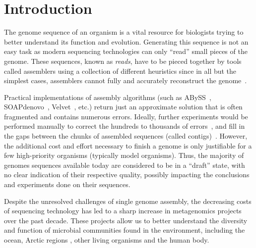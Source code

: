 \documentclass[conference]{IEEEtran}
\begin{document}




%
\IEEEpeerreviewmaketitle



\section{Introduction}
The genome sequence of an organism is a vital resource for biologists trying to better understand its function and evolution.
Generating this sequence is not an easy task as modern sequencing technologies can only ``read'' small pieces of the genome.
These sequences, known as \emph{reads}, have to be pieced together by tools called assemblers using a collection of different heuristics since in all but the simplest cases, assemblers cannot fully and accurately reconstruct the genome~\cite{myers1995,medvedev2007computability}.

Practical implementations of assembly algorithms (such as ABySS~\cite{ABySS}, SOAPdenovo~\cite{SOAPdenovo}, Velvet~\cite{Velvet}, etc.) return just an approximate solution that is often fragmented and contains numerous errors.
Ideally, further experiments would be performed manually to correct the hundreds to thousands of errors~\cite{salzberg2005misassemblies}, and fill in the gaps between the chunks of assembled sequences (called contigs)~\cite{nagarajan2010finishing}.
However, the additional cost and effort necessary to finish a genome is only justifiable for a few high-priority organisms (typically model organisms).
Thus, the majority of genomes sequences available today are considered to be in a ``draft'' state, with no clear indication of their respective quality, possibly impacting the conclusions and experiments done on their sequences.

Despite the unresolved challenges of single genome assembly, the decreasing costs of sequencing technology has led to a sharp increase in metagenomics projects over the past decade.
These projects allow us to better understand the diversity and function of microbial communities found in the environment, including the ocean\cite{rusch2007sorcerer,wu2011stalking,yooseph2007sorcerer}, Arctic regions \cite{varin2012metagenomic}, other living organisms\cite{he2013comparative} and the human body\cite{gill2006metagenomic,peterson2009nih}.
\end{document}
